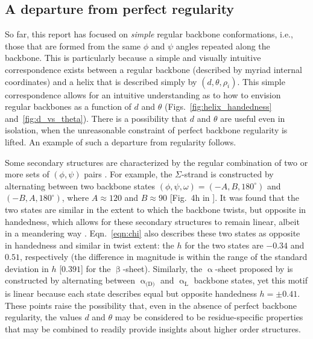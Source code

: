 \documentclass[fleqn,10pt,lineno]{wlpeerj} %
\newcommand{\n}[1]{{\color{black}#1}} %
\newcommand{\Figs}[1]{Figs.~\ref{#1}}
\newcommand{\Eqn}[1]{Eqn.~\ref{#1}}
\newcommand{\h}{h}
\begin{document}
\n{
\subsection*{A departure from perfect regularity}
So far, this report has focused on {\em simple} regular backbone conformations, i.e., those that are formed from the same $\phi$ and $\psi$ angles repeated along the backbone. This is particularly because a simple and visually intuitive correspondence exists between a regular backbone (described by myriad internal coordinates) and a helix that is described simply by $(d,\theta,\rho_i)$. This simple correspondence allows for an intuitive understanding as to how to envision regular backbones as a function of $d$ and $\theta$ (\Figs{fig:helix_handedness} and~\ref{fig:d_vs_theta}). There is a possibility that $d$ and $\theta$ are useful even in isolation, when the unreasonable constraint of perfect backbone regularity is lifted. An example of such a departure from regularity follows. 

Some secondary structures are characterized by the regular combination of two or more sets of $(\phi,\psi)$ pairs \citep{Pauling1951a, Pauling1951b, Armen2004, Daggett2006, Hayward2008, Mannige2015, Mannige2016}. For example, the $\Sigma$-strand is constructed by alternating between two backbone states $(\phi,\psi,\omega)=(-A,B,180^\circ)$ and $(-B,A,180^\circ)$, where $A \approx 120$ and $B \approx 90$ [Fig.~4h in \cite{Mannige2015}]. It was found that the two states are similar in the extent to which the backbone twists, but opposite in handedness, which allows for these secondary structures to remain linear, albeit in a meandering way \citep{Mannige2015}. \Eqn{eqn:chi} also describes these two states as opposite in handedness and similar in twist extent: the $\h$ for the two states are $-0.34$ and $0.51$, respectively (the difference in magnitude is within the range of the standard deviation in $\h$ [$0.391$] for the $\upbeta$-sheet). Similarly, the $\upalpha$-sheet proposed by \cite{Pauling1951b} is constructed by alternating between $\upalpha_\textrm{(D)}$ and $\upalpha_\textrm{L}$ backbone states,  yet this motif is linear because each state describes equal but opposite handedness $\h=\pm 0.41$. These points raise the possibility that, even in the absence of perfect backbone regularity, the values $d$ and $\theta$ may be considered to be residue-specific properties that may be combined to readily provide insights about higher order structures. %
}
\end{document}
